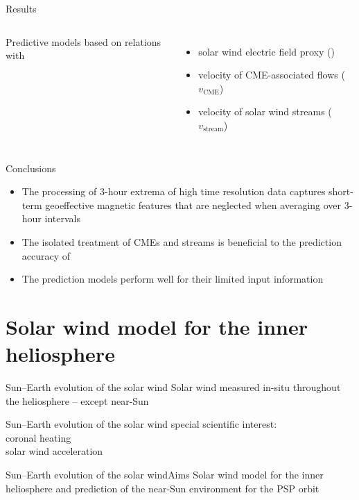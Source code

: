 \begin{frame}[c]{Results}{}
	\begin{columns}[c]
	\column{\textwidth}
		
		Predictive \Kp{} models based on relations with
		\begin{itemize}%
			\item solar wind electric field proxy (\vBz{})
			\item velocity of CME-associated flows ($v_\text{CME}$)
			\item velocity of solar wind streams ($v_\text{stream}$)
		\end{itemize}
		
	\end{columns}
\end{frame}
\begin{frame}[c]{Conclusions}{}
		
		\begin{itemize}%
			\item The processing of 3-hour extrema of high time resolution data captures short-term geoeffective magnetic features that are neglected when averaging over 3-hour intervals
			\item The isolated treatment of CMEs and streams is beneficial to the prediction accuracy of \Kp{}
			\item The prediction models perform well for their limited input information
		\end{itemize}
		
	
	\vspace*{\fill} \hfill \hyperlink{prediction_performance}{}
\end{frame}


\section{Solar wind model for the inner heliosphere}

\begin{frame}[c]{Sun--Earth evolution of the solar wind}{}
	Solar wind measured in-situ throughout the heliosphere -- except near-Sun
\end{frame}
\begin{frame}[c]{Sun--Earth evolution of the solar wind}{}
	special scientific interest:\\
	coronal heating\\
	solar wind acceleration
\end{frame}
\begin{frame}[c]{Sun--Earth evolution of the solar wind}{Aims}
	Solar wind model for the inner heliosphere and prediction of the near-Sun environment for the PSP orbit
\end{frame}

